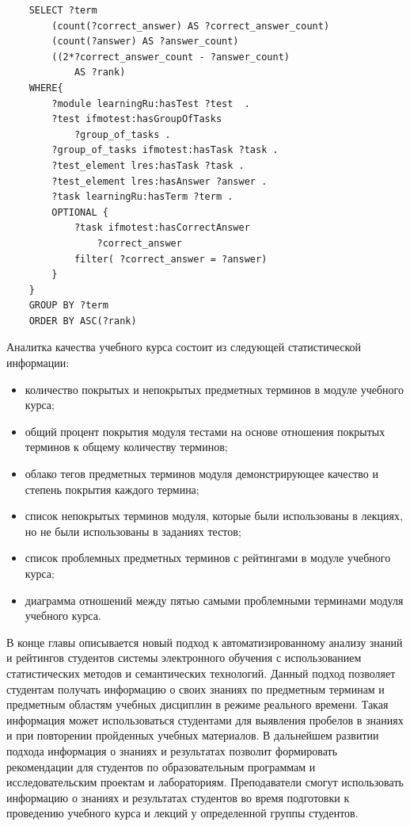 \begin{verbatim}
    SELECT ?term 
        (count(?correct_answer) AS ?correct_answer_count)
        (count(?answer) AS ?answer_count)
        ((2*?correct_answer_count - ?answer_count) 
            AS ?rank) 
    WHERE{
        ?module learningRu:hasTest ?test  . 
        ?test ifmotest:hasGroupOfTasks 
            ?group_of_tasks .        
        ?group_of_tasks ifmotest:hasTask ?task .      
        ?test_element lres:hasTask ?task .
        ?test_element lres:hasAnswer ?answer .
        ?task learningRu:hasTerm ?term .       
        OPTIONAL { 
            ?task ifmotest:hasCorrectAnswer 
                ?correct_answer
            filter( ?correct_answer = ?answer)
        }         
    }
    GROUP BY ?term 
    ORDER BY ASC(?rank)
\end{verbatim}


Аналитка качества учебного курса состоит из следующей статистической информации:
\begin{itemize}
\item количество покрытых и непокрытых предметных терминов в модуле учебного курса;
\item общий процент покрытия модуля тестами на основе отношения покрытых терминов к общему количеству терминов;
\item облако тегов предметных терминов модуля демонстрирующее качество и степень покрытия каждого термина;
\item список непокрытых терминов модуля, которые были использованы в лекциях, но не были использованы в заданиях тестов;
\item список проблемных предметных терминов с рейтингами в модуле учебного курса;
\item диаграмма отношений между пятью самыми проблемными терминами модуля учебного курса.
\end{itemize}


В конце главы описывается новый подход к автоматизированному анализу знаний и рейтингов студентов системы электронного обучения с использованием статистических методов и семантических технологий. Данный подход позволяет студентам получать информацию о своих знаниях по предметным терминам и предметным областям учебных дисциплин в режиме реального времени. Такая информация может использоваться студентами для выявления пробелов в знаниях и при повторении пройденных учебных материалов. В дальнейшем развитии подхода информация о знаниях и результатах позволит формировать рекомендации для студентов по образовательным программам и исследовательским проектам и лабораториям. Преподаватели смогут использовать информацию о знаниях и результатах студентов во время подготовки к проведению учебного курса и лекций у определенной группы студентов.

